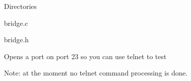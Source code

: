 \begin{DoxyParagraph}{Directories}
\begin{DoxyItemize}
\begin{DoxyItemize}
\begin{DoxyItemize}
\item bridge.\+c
\item bridge.\+h
\begin{DoxyItemize}
\item Opens a port on port 23 so you can use telnet to test
\begin{DoxyItemize}
\item Note\+: at the moment no telnet command processing is done.
\end{DoxyItemize}
\end{DoxyItemize}
\end{DoxyItemize}
\end{DoxyItemize}
\end{DoxyItemize}
\end{DoxyParagraph}

